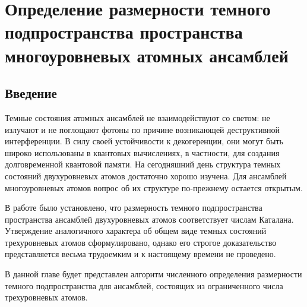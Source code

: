 \chapter{Определение размерности темного подпространства пространства многоуровневых атомных ансамблей}\label{ch:ch4}

\section{Введение}\label{sec:ch4/sect1}

Темные состояния атомных ансамблей не взаимодействуют со светом: не излучают и не поглощают фотоны по причине возникающей деструктивной интерференции. В силу своей устойчивости к декогеренции, они могут быть широко использованы в квантовых вычислениях, в частности, для создания долговременной квантовой памяти. На сегодняшний день структура темных состояний двухуровневых атомов достаточно хорошо изучена. Для ансамблей многоуровневых атомов вопрос об их структуре по-прежнему остается открытым.

В работе \cite{dark_states_dimension} было установлено, что размерность темного подпространства пространства ансамблей двухуровневых атомов соответствует числам Каталана. Утверждение аналогичного характера об общем виде темных состояний трехуровневых атомов сформулировано, однако его строгое доказательство представляется весьма трудоемким и к настоящему времени не проведено.

В данной главе будет представлен алгоритм численного определения раз­мерности темного подпространства для ансамблей, состоящих из ограниченного числа трехуровневых атомов.

